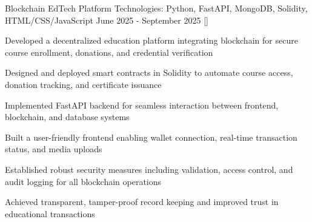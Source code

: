 
\resumeProject
  {Blockchain EdTech Platform}
  {Technologies: Python, FastAPI, MongoDB, Solidity, HTML/CSS/JavaScript}
  {June 2025 - September 2025}
  {{}[\href{https://github.com/Seth786x}{\textcolor{darkblue}{\faGithub}}]}
\resumeItemListStart
  \item Developed a decentralized education platform integrating blockchain for secure course enrollment, donations, and credential verification
  \item Designed and deployed smart contracts in Solidity to automate course access, donation tracking, and certificate issuance
  \item Implemented FastAPI backend for seamless interaction between frontend, blockchain, and database systems
  \item Built a user-friendly frontend enabling wallet connection, real-time transaction status, and media uploads
  \item Established robust security measures including validation, access control, and audit logging for all blockchain operations
  \item Achieved transparent, tamper-proof record keeping and improved trust in educational transactions
\resumeItemListEnd
